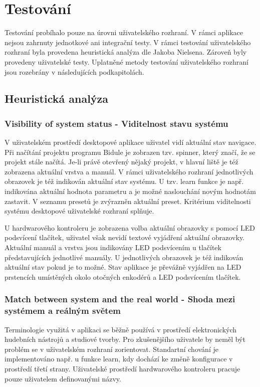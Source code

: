 \documentclass[thesis=M,czech]{FITthesis}[2019/03/06]
\begin{document}
\chapter{Testování}
	Testování probíhalo pouze na úrovni uživatelského rozhraní. V rámci aplikace nejsou zahrnuty jednotkové ani integrační testy.
	V rámci testování uživatelského rozhraní byla provedena heuristická analýza dle Jakoba Nielsena\cite{nielsen-heuristics}. Zároveň byly provedeny uživatelské testy.
	Uplatněné metody testování uživatelského rozhraní jsou rozebrány v následujících podkapitolách.

	\section{Heuristická analýza}
		\subsection{Visibility of system status - Viditelnost stavu systému}
			V uživatelském prostředí desktopové aplikace uživatel vidí aktuální stav navigace.
			Při načítání projektu programu Bidule je zobrazen tzv. spinner,	který značí, že se projekt stále načítá.
			Je-li právě otevřený nějaký projekt, v hlavní liště je též zobrazena aktuální vrstva a manuál. 
			V rámci uživatelského rozhraní jednotlivých obrazovek je též indikován aktuální stav systému. U tzv. learn funkce je např. indikována aktuální hodnota parametru a je možné naslouchání novým hodnotám zastavit. V seznamu presetů je zvýrazněn aktuální preset.
			Kritérium viditelnosti systému desktopové uživatelské rozhraní splňuje.
			
			U hardwarového kontroleru je zobrazena volba aktuální obrazovky s pomocí LED podsvícení tlačítek, uživatel však nevidí textové vyjádření aktuální obrazovky. Aktuální manuál a vrstva jsou indikovány LED podsvícením u tlačítek představujících jednotlivé manuály. U jednotlivých obrazovek je též indikován aktuální stav pokud je to možné. Stav aplikace je převážně vyjádřen na LED prstencích umístěných okolo otočných enkodérů a LED podsvícením tlačítek.			
		\subsection{Match between system and the real world - Shoda mezi systémem a reálným světem}\label{sec:heuristics-2}
			Terminologie využitá v aplikaci se běžně používá v prostředí elektronických hudebních nástrojů a studiové tvorby. Pro zkušenějšího uživatele by neměl být problém se v uživatelském rozhraní zorientovat. 
			Standartní chování je implementováno např. u funkce learn, kdy dochází ke změně konfigurace v prostředí třetí strany.
			Uživatelské prostředí hardwarového kontroleru pracuje pouze uživatelem definovanými názvy.
			
\end{document}

